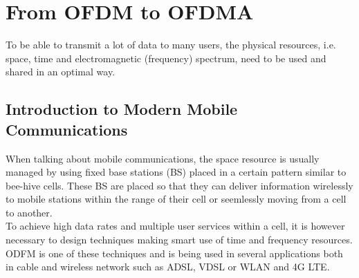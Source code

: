 \chapter{From OFDM to OFDMA}
To be able to transmit a lot of data to many users, the physical resources, i.e. space, time and electromagnetic (frequency) spectrum, need to be used and shared in an optimal way.\\
%
\section{Introduction to Modern Mobile Communications}
When talking about mobile communications, the space  resource is usually managed by using fixed base stations (BS) placed in a certain pattern similar to bee-hive cells. These BS are placed so that they can deliver information wirelessly to mobile stations within the range of their cell or seemlessly moving from a cell to another.\\
%
\indent
To achieve high data rates and multiple user services within a cell, it is however necessary to design techniques making smart use of time and frequency resources. ODFM is one of these techniques and is being used in several applications both in cable and wireless network such as ADSL, VDSL or WLAN and 4G LTE.